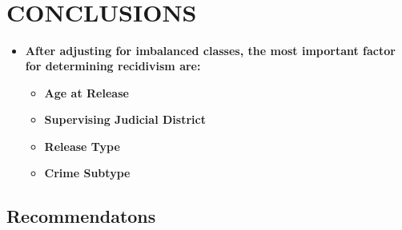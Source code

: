 \documentclass[11pt]{article}
\providecommand{\tightlist}{%
      \setlength{\itemsep}{0pt}\setlength{\parskip}{0pt}}
\begin{document}
    \begin{center}
    \end{center}
    { \hspace*{\fill} \\}
    
    \begin{center}
    \end{center}
    { \hspace*{\fill} \\}
    
    \begin{center}
    \end{center}
    { \hspace*{\fill} \\}
    
    \begin{center}
    \end{center}
    { \hspace*{\fill} \\}
    
    \hypertarget{conclusions}{%
\section{CONCLUSIONS}\label{conclusions}}

\begin{itemize}
\tightlist
\item
  \textbf{After adjusting for imbalanced classes, the most important
  factor for determining recidivism are:}

  \begin{itemize}
  \tightlist
  \item
    \textbf{Age at Release}
  \item
    \textbf{Supervising Judicial District}
  \item
    \textbf{Release Type}
  \item
    \textbf{Crime Subtype}
  \end{itemize}
\end{itemize}

\hypertarget{recommendatons}{%
\subsection{Recommendatons}\label{recommendatons}}
\end{document}
